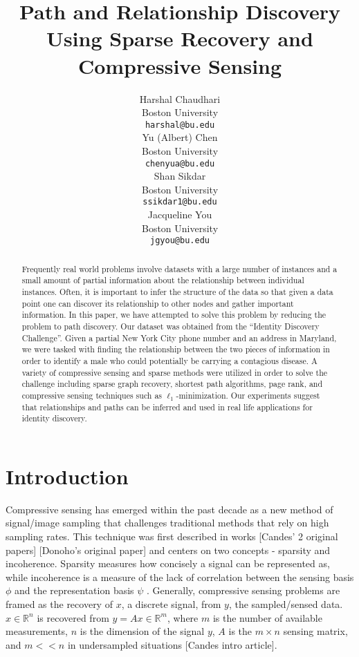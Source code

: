 \documentclass{article} %
\title{Path and Relationship Discovery Using Sparse Recovery and Compressive Sensing}
\author{
Harshal Chaudhari\\
Boston University \\
\texttt{harshal@bu.edu} \\
\And
Yu (Albert) Chen\\
Boston University \\
\texttt{chenyua@bu.edu} \\
\And
Shan Sikdar\\
Boston University  \\
\texttt{ssikdar1@bu.edu} \\
\And
Jacqueline You\\
Boston University \\
\texttt{jgyou@bu.edu} \\
}
\begin{document}
\maketitle

\begin{abstract}
Frequently real world problems involve datasets with a large number of instances and a small amount of partial information about the relationship between individual instances. Often, it is important to infer the structure of the data so that given a data point one can discover its relationship to other nodes and gather important information. In this paper, we have attempted to solve this problem by reducing the problem to path discovery.  Our dataset was obtained from the “Identity Discovery Challenge”. Given a partial New York City phone number and an address in Maryland, we were tasked with finding the relationship between the two pieces of information in order to identify a male who could potentially be carrying a contagious disease.  A variety of compressive sensing and sparse methods were utilized in order to solve the challenge including sparse graph recovery, shortest path algorithms, page rank, and compressive sensing techniques such as $\ell_1$-minimization. Our experiments suggest that relationships and paths can be inferred and used in real life applications for identity discovery.
\end{abstract}


\section{Introduction}


Compressive sensing has emerged within the past decade as a new method of signal/image sampling that challenges traditional methods that rely on high sampling rates. This technique was first described in works [Candes' 2 original papers] [Donoho's original paper] and centers on two concepts - sparsity and incoherence. Sparsity measures how concisely a signal can be represented as, while incoherence is a measure of the lack of correlation between the sensing basis $\phi$ and the representation basis $\psi$ . Generally, compressive sensing problems are framed as the recovery of $x$, a discrete signal, from $y$, the sampled/sensed data. $x \in  \mathbb{R}^n$ is recovered from $y=Ax \in  \mathbb{R}^m $, where $m$ is the number of available measurements, $n$ is the dimension of the signal $y$, $A$ is the $m \times n$ sensing matrix, and $m << n$  in undersampled situations [Candes intro article].
\end{document}
